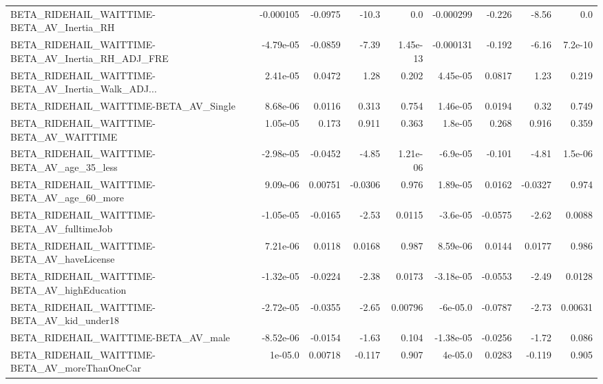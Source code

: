 \begin{tabular}{lrrrrrrrr}
BETA\_RIDEHAIL\_WAITTIME-BETA\_AV\_Inertia\_RH          &   -0.000105 &      -0.0975 &    -10.3 &      0.0 &  -0.000299 &      -0.226 &        -8.56 &           0.0 \\
BETA\_RIDEHAIL\_WAITTIME-BETA\_AV\_Inertia\_RH\_ADJ\_FRE  &   -4.79e-05 &      -0.0859 &    -7.39 & 1.45e-13 &  -0.000131 &      -0.192 &        -6.16 &       7.2e-10 \\
BETA\_RIDEHAIL\_WAITTIME-BETA\_AV\_Inertia\_Walk\_ADJ... &    2.41e-05 &       0.0472 &     1.28 &    0.202 &   4.45e-05 &      0.0817 &         1.23 &         0.219 \\
BETA\_RIDEHAIL\_WAITTIME-BETA\_AV\_Single              &    8.68e-06 &       0.0116 &    0.313 &    0.754 &   1.46e-05 &      0.0194 &         0.32 &         0.749 \\
BETA\_RIDEHAIL\_WAITTIME-BETA\_AV\_WAITTIME            &    1.05e-05 &        0.173 &    0.911 &    0.363 &    1.8e-05 &       0.268 &        0.916 &         0.359 \\
BETA\_RIDEHAIL\_WAITTIME-BETA\_AV\_age\_35\_less         &   -2.98e-05 &      -0.0452 &    -4.85 & 1.21e-06 &   -6.9e-05 &      -0.101 &        -4.81 &       1.5e-06 \\
BETA\_RIDEHAIL\_WAITTIME-BETA\_AV\_age\_60\_more         &    9.09e-06 &      0.00751 &  -0.0306 &    0.976 &   1.89e-05 &      0.0162 &      -0.0327 &         0.974 \\
BETA\_RIDEHAIL\_WAITTIME-BETA\_AV\_fulltimeJob         &   -1.05e-05 &      -0.0165 &    -2.53 &   0.0115 &   -3.6e-05 &     -0.0575 &        -2.62 &        0.0088 \\
BETA\_RIDEHAIL\_WAITTIME-BETA\_AV\_haveLicense         &    7.21e-06 &       0.0118 &   0.0168 &    0.987 &   8.59e-06 &      0.0144 &       0.0177 &         0.986 \\
BETA\_RIDEHAIL\_WAITTIME-BETA\_AV\_highEducation       &   -1.32e-05 &      -0.0224 &    -2.38 &   0.0173 &  -3.18e-05 &     -0.0553 &        -2.49 &        0.0128 \\
BETA\_RIDEHAIL\_WAITTIME-BETA\_AV\_kid\_under18         &   -2.72e-05 &      -0.0355 &    -2.65 &  0.00796 &   -6e-05.0 &     -0.0787 &        -2.73 &       0.00631 \\
BETA\_RIDEHAIL\_WAITTIME-BETA\_AV\_male                &   -8.52e-06 &      -0.0154 &    -1.63 &    0.104 &  -1.38e-05 &     -0.0256 &        -1.72 &         0.086 \\
BETA\_RIDEHAIL\_WAITTIME-BETA\_AV\_moreThanOneCar      &     1e-05.0 &      0.00718 &   -0.117 &    0.907 &    4e-05.0 &      0.0283 &       -0.119 &         0.905 \\

\end{tabular}
